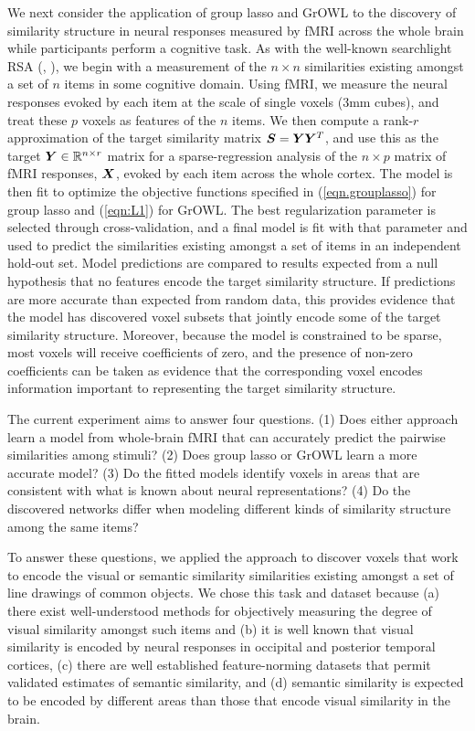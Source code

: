 We next consider the application of group lasso and GrOWL to the discovery of similarity
structure in neural responses measured by fMRI across the whole brain while participants
perform a cognitive task. As with the well-known searchlight RSA (\cite{RSA},
\cite{similarity}), we begin with a measurement of the $n \times n $ similarities existing
amongst a set of $n$ items in some cognitive domain.  Using fMRI, we measure the neural
responses evoked by each item at the scale of single voxels (3mm cubes), and treat these
$p$ voxels as features of the $n$ items. We then compute a rank-$r$ approximation of the
target similarity matrix $\boldsymbol{S} = \boldsymbol{Y} \boldsymbol{Y}^T$, and use this as the target $\boldsymbol{Y} \in {\mathbb R}^{n
  \times r} $ matrix for a sparse-regression analysis of the $n \times p$ matrix of fMRI
responses, $\boldsymbol{X}$,  evoked by each item across the whole cortex. The model is then fit to
optimize the objective functions specified in (\ref{eqn.grouplasso}) for group lasso and
(\ref{eqn:L1}) for GrOWL. The best regularization parameter is selected through
cross-validation, and a final model is fit with that parameter and used to predict the
similarities existing amongst a set of items in an independent hold-out set. Model
predictions are compared to results expected from a null hypothesis that no features
encode the target similarity structure. If predictions are more accurate than expected
from random data, this provides evidence that the model has discovered voxel subsets that
jointly encode some of the target similarity structure. Moreover, because the model is
constrained to be sparse, most voxels will receive coefficients of zero, and the presence
of non-zero coefficients can be taken as evidence that the corresponding voxel encodes
information important to representing the target similarity structure.

The current experiment aims to answer four questions. (1) Does either approach learn a
model from whole-brain fMRI that can accurately predict the pairwise similarities among
stimuli? (2) Does group lasso or GrOWL learn a more accurate model? (3) Do the fitted
models identify voxels in areas that are consistent with what is known about neural
representations? (4) Do the discovered networks differ when modeling different kinds of
similarity structure among the same items?

To answer these questions, we applied the approach to discover voxels that work to encode
the visual or semantic similarity similarities existing amongst a set of line drawings of
common objects. We chose this task and dataset because (a) there exist well-understood
methods for objectively measuring the degree of visual similarity amongst such items
\cite{antani02} and (b) it is well known that visual similarity is encoded by neural
responses in occipital and posterior temporal cortices, (c) there are well established
feature-norming datasets that permit validated estimates of semantic similarity, and (d)
semantic similarity is
expected to be encoded by different areas than those that encode visual similarity in the brain.

